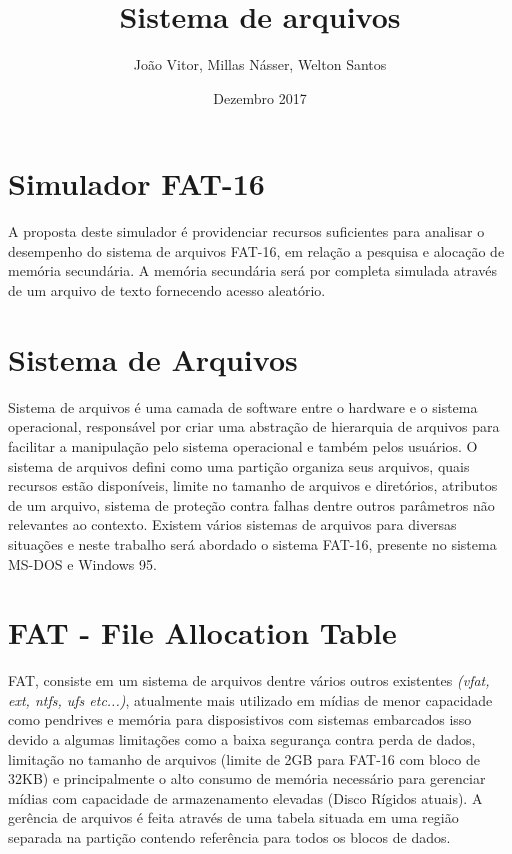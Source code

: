 \documentclass{article}
\title{Sistema de arquivos}
\author{João Vitor, Millas Násser, Welton Santos}
\date{Dezembro 2017}
\begin{document}
\maketitle

\section{Simulador FAT-16}
A proposta deste simulador é providenciar recursos suficientes para analisar o desempenho do sistema de arquivos FAT-16, em relação a pesquisa e alocação de memória secundária. A memória secundária será por completa simulada através de um arquivo de texto fornecendo acesso aleatório.
\section{Sistema de Arquivos}
Sistema de arquivos é uma camada de software entre o hardware e o sistema operacional, responsável por criar uma abstração de hierarquia de arquivos para facilitar a manipulação pelo sistema operacional e também pelos usuários. O sistema de arquivos defini como uma partição organiza seus arquivos, quais recursos estão disponíveis, limite no tamanho de arquivos e diretórios, atributos de um arquivo, sistema de proteção contra falhas dentre outros parâmetros não relevantes ao contexto. Existem vários sistemas de arquivos para diversas situações e neste trabalho será abordado o sistema FAT-16, presente no sistema MS-DOS e Windows 95.
\section{FAT - File Allocation Table}
FAT, consiste em um sistema de arquivos dentre vários outros existentes \textit{(vfat, ext, ntfs, ufs etc...)}, atualmente mais utilizado em mídias de menor capacidade como pendrives e memória para disposistivos com sistemas embarcados isso devido a algumas limitações como a baixa segurança contra perda de dados, limitação no tamanho de arquivos (limite de 2GB para FAT-16 com bloco de 32KB) e principalmente o alto consumo de memória necessário para gerenciar mídias com capacidade de armazenamento elevadas (Disco Rígidos atuais).
A gerência de arquivos é feita através de uma tabela situada em uma região separada na partição contendo referência para todos os blocos de dados. 
\end{document}
